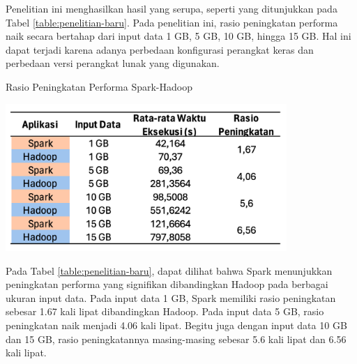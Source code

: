 Penelitian ini menghasilkan hasil yang serupa, seperti yang ditunjukkan pada Tabel \ref{table:penelitian-baru}. Pada penelitian ini, rasio peningkatan performa naik secara bertahap dari input data 1 GB, 5 GB, 10 GB, hingga 15 GB. Hal ini dapat terjadi karena adanya perbedaan konfigurasi perangkat keras dan perbedaan versi perangkat lunak yang digunakan.

\begin{table}[h]
  \centering
  \caption{Rasio Peningkatan Performa Spark-Hadoop}
  \includegraphics[width=0.8\textwidth]{figures/ch04/0-penelitian-baru}
  \label{table:penelitian-baru}
\end{table}

Pada Tabel \ref{table:penelitian-baru}, dapat dilihat bahwa Spark menunjukkan peningkatan performa yang signifikan dibandingkan Hadoop pada berbagai ukuran input data. Pada input data 1 GB, Spark memiliki rasio peningkatan sebesar 1.67 kali lipat dibandingkan Hadoop. Pada input data 5 GB, rasio peningkatan naik menjadi 4.06 kali lipat. Begitu juga dengan input data 10 GB dan 15 GB, rasio peningkatannya masing-masing sebesar 5.6 kali lipat dan 6.56 kali lipat.



